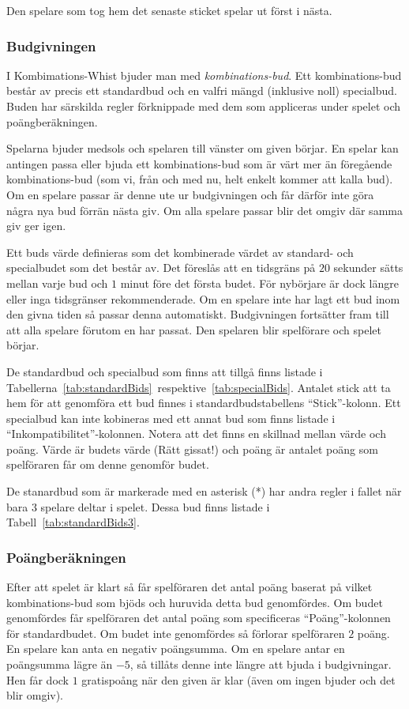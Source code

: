 \documentclass[a4paper]{article}
\begin{document}
{{{				Den spelare som tog hem det senaste sticket spelar ut först i nästa.
			}

			\subsubsection{Budgivningen}{\label{sec:bidding}
				I Kombimations-Whist bjuder man med \emph{kombinations-bud}. Ett kombinations-bud består av precis ett standardbud och en valfri mängd (inklusive noll) specialbud. Buden har särskilda regler förknippade med dem som appliceras under spelet och poängberäkningen.

				Spelarna bjuder medsols och spelaren till vänster om given börjar. En spelar kan antingen passa eller bjuda ett kombinations-bud som är värt mer än föregående kombinations-bud (som vi, från och med nu, helt enkelt kommer att kalla bud). Om en spelare passar är denne ute ur budgivningen och får därför inte göra några nya bud förrän nästa giv. Om alla spelare passar blir det omgiv där samma giv ger igen.

				Ett buds värde definieras som det kombinerade värdet av standard- och specialbudet som det består av. Det föreslås att en tidsgräns på $20$ sekunder sätts mellan varje bud och $1$ minut före det första budet. För nybörjare är dock längre eller inga tidsgränser rekommenderade. Om en spelare inte har lagt ett bud inom den givna tiden så passar denna automatiskt. Budgivningen fortsätter fram till att alla spelare förutom en har passat. Den spelaren blir spelförare och spelet börjar.

				De standardbud och specialbud som finns att tillgå finns listade i Tabellerna~\ref{tab:standardBids}~respektive~\ref{tab:specialBids}. Antalet stick att ta hem för att genomföra ett bud finnes i standardbudstabellens ``Stick''-kolonn. Ett specialbud kan inte kobineras med ett annat bud som finns listade i ``Inkompatibilitet''-kolonnen. Notera att det finns en skillnad mellan värde och poäng. Värde är budets värde (Rätt gissat!) och poäng är antalet poäng som spelföraren får om denne genomför budet.

				De stanardbud som är markerade med en asterisk (*) har andra regler i fallet när bara $3$ spelare deltar i spelet. Dessa bud finns listade i Tabell~\ref{tab:standardBids3}.
			}

			\subsubsection{Poängberäkningen}{%
				Efter att spelet är klart så får spelföraren det antal poäng baserat på vilket kombinations-bud som bjöds och huruvida detta bud genomfördes. Om budet genomfördes får spelföraren det antal poäng som specificeras ``Poäng''-kolonnen för standardbudet. Om budet inte genomfördes så förlorar spelföraren $2$ poäng. En spelare kan anta en negativ poängsumma. Om en spelare antar en poängsumma lägre än $-5$, så tillåts denne inte längre att bjuda i budgivningar. Hen får dock $1$ gratispoång när den given är klar (även om ingen bjuder och det blir omgiv).
			}

}}
\end{document}
